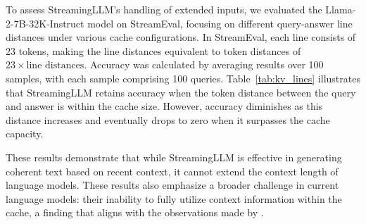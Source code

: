 \documentclass{article} \usepackage{iclr2024_conference,times}
\def\method{StreamingLLM\xspace}
\begin{document}
 To assess \method's handling of extended inputs, we evaluated the Llama-2-7B-32K-Instruct model on StreamEval, focusing on different query-answer line distances under various cache configurations. In StreamEval, each line consists of 23 tokens, making the line distances equivalent to token distances of $23 \times \text{line distances}$. Accuracy was calculated by averaging results over 100 samples, with each sample comprising 100 queries. Table~\ref{tab:kv_lines} illustrates that \method retains accuracy when the token distance between the query and answer is within the cache size. However, accuracy diminishes as this distance increases and eventually drops to zero when it surpasses the cache capacity.

These results demonstrate that while \method is effective in generating coherent text based on recent context, it cannot extend the context length of language models. These results also emphasize a broader challenge in current language models: their inability to fully utilize context information within the cache, a finding that aligns with the observations made by \citeauthor{liu2023lost}.
\end{document}
